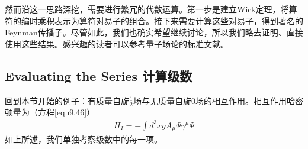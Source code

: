 然而沿这一思路深挖，需要进行繁冗的代数运算。第一步是建立Wick定理，将算符的编时乘积表示为算符对易子的组合。接下来需要计算这些对易子，得到著名的Feynman传播子。尽管如此，我们也确实希望继续讨论，所以我们略去证明、直接使用这些结果。感兴趣的读者可以参考量子场论的标准文献。

\subsection[计算级数]{Evaluating the Series \quad 计算级数}\label{sec9.5.4}
回到本节开始的例子：有质量自旋$\frac{1}{2}$场与无质量自旋$0$场的相互作用。相互作用哈密顿量为（方程\eqref{equ9.46}）
\begin{gather*}
H_I=-\int d^3x g A_\mu\bar{\Psi}\gamma^\mu\Psi
\end{gather*}
如上所述，我们单独考察级数中的每一项。

